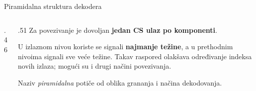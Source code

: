 \begin{frame}[label=03-s009]{Piramidalna struktura dekodera}
\begin{columns}[c,onlytextwidth]
\begin{column}{.46\textwidth}\centering

\end{column}
\begin{column}{.51\textwidth}
Za povezivanje je dovoljan \textbf{jedan CS ulaz po komponenti}.
\par\vspace{1mm}
U izlaznom nivou koriste se signali \textbf{najmanje težine}, a u prethodnim nivoima
signali sve veće težine. Takav raspored olakšava određivanje indeksa novih izlaza;
mogući su i drugi načini povezivanja.
\par\vspace{1mm}
\par\vspace{1mm}
Naziv \emph{piramidalna} potiče od oblika grananja i načina dekodovanja.
\end{column}
\end{columns}
\end{frame}
